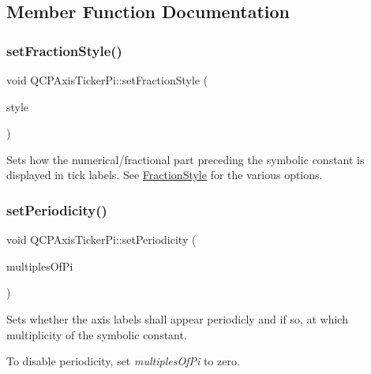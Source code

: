\subsection{Member Function Documentation}
\mbox{\label{class_q_c_p_axis_ticker_pi_a760c8af6ca68178e607556c4e5049d71}} 
\subsubsection{\texorpdfstring{set\+Fraction\+Style()}{setFractionStyle()}}
{\footnotesize\ttfamily void Q\+C\+P\+Axis\+Ticker\+Pi\+::set\+Fraction\+Style (\begin{DoxyParamCaption}\item[{\hyperlink{class_q_c_p_axis_ticker_pi_a262f1534c7f0c79a7d5237f5d1e2c54c}{Q\+C\+P\+Axis\+Ticker\+Pi\+::\+Fraction\+Style}}]{style }\end{DoxyParamCaption})}

Sets how the numerical/fractional part preceding the symbolic constant is displayed in tick labels. See \hyperlink{class_q_c_p_axis_ticker_pi_a262f1534c7f0c79a7d5237f5d1e2c54c}{Fraction\+Style} for the various options. \mbox{\label{class_q_c_p_axis_ticker_pi_a58f538dc01860fb56e46970e28a87f03}} 
\subsubsection{\texorpdfstring{set\+Periodicity()}{setPeriodicity()}}
{\footnotesize\ttfamily void Q\+C\+P\+Axis\+Ticker\+Pi\+::set\+Periodicity (\begin{DoxyParamCaption}\item[{int}]{multiples\+Of\+Pi }\end{DoxyParamCaption})}

Sets whether the axis labels shall appear periodicly and if so, at which multiplicity of the symbolic constant.

To disable periodicity, set {\itshape multiples\+Of\+Pi} to zero.

